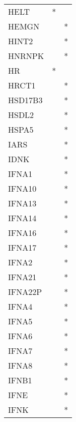 \begin{longtable}{lcc}
HELT                  &              * &            \\
HEMGN                 &                &          * \\
HINT2                 &                &          * \\
HNRNPK                &                &          * \\
HR                    &              * &            \\
HRCT1                 &                &          * \\
HSD17B3               &                &          * \\
HSDL2                 &                &          * \\
HSPA5                 &                &          * \\
IARS                  &                &          * \\
IDNK                  &                &          * \\
IFNA1                 &                &          * \\
IFNA10                &                &          * \\
IFNA13                &                &          * \\
IFNA14                &                &          * \\
IFNA16                &                &          * \\
IFNA17                &                &          * \\
IFNA2                 &                &          * \\
IFNA21                &                &          * \\
IFNA22P               &                &          * \\
IFNA4                 &                &          * \\
IFNA5                 &                &          * \\
IFNA6                 &                &          * \\
IFNA7                 &                &          * \\
IFNA8                 &                &          * \\
IFNB1                 &                &          * \\
IFNE                  &                &          * \\
IFNK                  &                &          * \\

\end{longtable}
